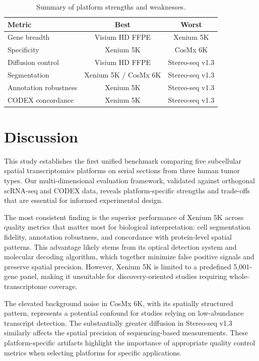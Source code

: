 \documentclass[11pt]{article}
\begin{document}
\begin{table}[h]
\centering
\caption{Summary of platform strengths and weaknesses.}
\label{tab:summary}
\small
\begin{tabular}{lcc}
\toprule
Metric & Best & Worst \\
\midrule
Gene breadth & Visium HD FFPE & Xenium 5K \\
Specificity & Xenium 5K & CosMx 6K \\
Diffusion control & Visium HD FFPE & Stereo-seq v1.3 \\
Segmentation & Xenium 5K / CosMx 6K & Stereo-seq v1.3 \\
Annotation robustness & Xenium 5K & Stereo-seq v1.3 \\
CODEX concordance & Xenium 5K & Stereo-seq v1.3 \\
\bottomrule
\end{tabular}
\end{table}

\section{Discussion}

This study establishes the first unified benchmark comparing five subcellular spatial transcriptomics platforms on serial sections from three human tumor types. Our multi-dimensional evaluation framework, validated against orthogonal scRNA-seq and CODEX data, reveals platform-specific strengths and trade-offs that are essential for informed experimental design.

The most consistent finding is the superior performance of Xenium 5K across quality metrics that matter most for biological interpretation: cell segmentation fidelity, annotation robustness, and concordance with protein-level spatial patterns. This advantage likely stems from its optical detection system and molecular decoding algorithm, which together minimize false positive signals and preserve spatial precision. However, Xenium 5K is limited to a predefined 5,001-gene panel, making it unsuitable for discovery-oriented studies requiring whole-transcriptome coverage.

The elevated background noise in CosMx 6K, with its spatially structured pattern, represents a potential confound for studies relying on low-abundance transcript detection. The substantially greater diffusion in Stereo-seq v1.3 similarly affects the spatial precision of sequencing-based measurements. These platform-specific artifacts highlight the importance of appropriate quality control metrics when selecting platforms for specific applications.
\end{document}
